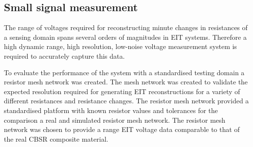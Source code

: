 \subsection{Small signal measurement}
The range of voltages required for reconstructing minute changes in resistances of a sensing domain spans several orders of magnitudes in EIT systems. Therefore a high dynamic range, high resolution, low-noise voltage measurement system is required to accurately capture this data.

To evaluate the performance of the system with a standardised testing domain a resistor mesh network was created. The mesh network was created to validate the expected resolution required for generating EIT reconstructions \cite{Ellingham2022} for a variety of different resistances and resistance changes. The resistor mesh network provided a standardised platform with known resistor values and tolerances for the comparison a real and simulated resistor mesh network. The resistor mesh network was chosen to provide a range EIT voltage data comparable to that of the real CBSR composite material.

